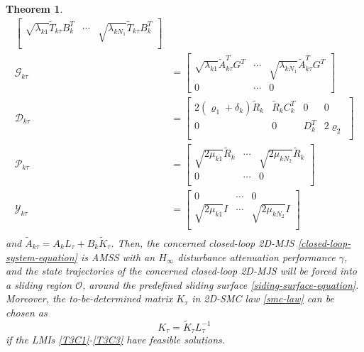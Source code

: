 \documentclass[conference]{IEEEtran}
\newtheorem{theorem}{Theorem}
\begin{document}
\begin{theorem}
\begin{equation}
\begin{split}
\begin{bmatrix}
				\sqrt{\lambda_{k1}}\tilde{T}_{k\tau }B^{T}_{k} &\cdots&\sqrt{\lambda_{kN_{1}}} \tilde{T}_{k\tau }B^{T}_{k}\\
			\end{bmatrix} \\
			\mathscr{G}_{k\tau } &=\begin{bmatrix}
				\sqrt{\lambda_{k1}} \tilde{A}^{T}_{k\tau }G^{T}& \cdots&\sqrt{\lambda_{kN_{1}}} \tilde{A}^{T}_{k\tau }G^{T}\\
				0  &\cdots& 0
			\end{bmatrix}\\
			\mathscr{D}_{k\tau } &= \begin{bmatrix}
				2(\varrho_{1}+ \delta_{k} )\tilde{R}_{k}& \tilde{R}_{k}C^{T}_{k}&0&0\\
				0&0&D^{T}_{k}&2\varrho_{2} \\
			\end{bmatrix} \\	
			\mathscr{P}_{k\tau } &= \begin{bmatrix}
				\sqrt{2\mu_{k1}} \tilde{R}_{k} &\cdots &\sqrt{2\mu_{kN_{2}}} \tilde{R}_{k}\\
				0 & \cdots & 0\\
			\end{bmatrix}	\\
			\mathscr{Y}_{k\tau } &= \begin{bmatrix}
				0 & \cdots & 0\\
				\sqrt{2\mu_{k1}} I &\cdots &\sqrt{2\mu_{kN_{2}}} I\\
			\end{bmatrix}	\\						
		\end{split}
	\end{equation}
	and $\tilde{A}_{k\tau } =  A_{k}L_{\tau } + B_{k}\tilde{K}_{\tau }$. Then,  the concerned closed-loop 2D-MJS \eqref{closed-loop-system-equation} is AMSS with an $H_{\infty}$ disturbance attenuation  performance $\gamma$, and the state trajectories of the concerned closed-loop 2D-MJS will be forced into a sliding region $\mathcal{O}$, around the predefined sliding surface \eqref{siding-surface-equation}. Moreover, the to-be-determined matrix $K_{\tau }$ in 2D-SMC law \eqref{smc-law} can be chosen as 
	\begin{equation}
		K_{\tau } = \tilde{K}_{\tau }L^{-1}_{\tau }
	\end{equation}
	if the LMIs \eqref{T3C1}-\eqref{T3C3} have feasible solutions.
\end{theorem}
\end{document}
